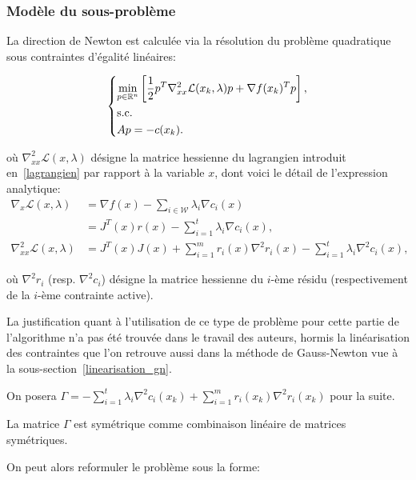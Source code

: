 \subsubsection{Modèle du sous-problème}

La direction de Newton est calculée via la résolution du problème quadratique sous contraintes d'égalité linéaires:

\begin{equation}
    \left\{ \begin{aligned}
        &\underset{p \in \mathbb{R}^{n}}{\min}\left[ \dfrac{1}{2}p^{T}\nabla_{xx}^{2}\mathcal{L}(x_{k},\lambda)p + \nabla f(x_{k})^{T}p\right],\\
        &\text{s.c.}\\
        &A p = -c(x_{k}).
        \end{aligned} \right.
\end{equation}


où $\nabla^{2}_{xx}\mathcal{L}(x,\lambda)$ désigne la matrice hessienne du lagrangien introduit en~\eqref{lagrangien} par rapport à la variable $x$, dont voici le détail de l'expression analytique:
\[
\begin{aligned}\nabla_{x}\mathcal{L}(x,\lambda)&=\nabla f(x) - \sum\limits_{i \in \mathcal{W}} \lambda_{i}\nabla c_{i}(x)\\
&= J^{T}(x)r(x) - \sum\limits_{i=1}^{t} \lambda_{i}\nabla c_{i}(x),\\
\nabla^{2}_{xx}\mathcal{L}(x,\lambda) &= J^{T}(x)J(x)+ \sum\limits_{i=1}^{m}r_i(x)\nabla^2r_i(x) - \sum\limits_{i=1}^{t}\lambda_i\nabla^2c_{i}(x),
\end{aligned}
\]

où $\nabla^2 r_i$ (resp. $\nabla^2 c_i$) désigne la matrice hessienne du $i$-ème résidu (respectivement de la $i$-ème contrainte active).

La justification quant à l'utilisation de ce type de problème pour cette partie de l'algorithme n'a pas été trouvée dans le travail des auteurs, hormis la linéarisation 
des contraintes que l'on retrouve aussi dans la méthode de Gauss-Newton vue à la sous-section~\ref{linearisation_gn}.

On posera $\Gamma = - \sum\limits_{i=1}^{t}\lambda_i\nabla^2c_i(x_{k}) + \sum\limits_{i=1}^{m}r_i(x_{k})\nabla^2r_i(x_{k})$ pour la suite. 

La matrice $\Gamma$ est symétrique comme combinaison linéaire de matrices symétriques.

On peut alors reformuler le problème sous la forme:

